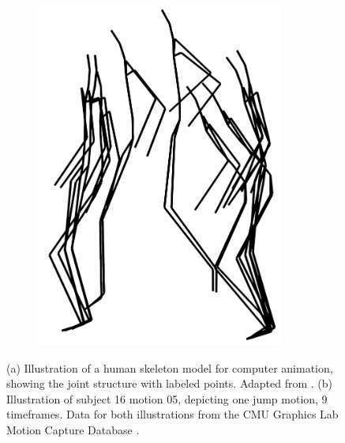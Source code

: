 \begin{figure}[ht]
\begin{subfigure}[b]{0.4\textwidth}
        \includegraphics[height=0.3\textheight ,width=0.9\textwidth]{figures/motion-capture-data/Fig_16_05_trace_9_frames.png}
        \caption{}
        \label{fig:jump_motion}
    \end{subfigure}
    \caption[Visualization of the Motion Capture Data]{(a) Illustration of a human skeleton model for computer animation, showing the joint structure with labeled points. Adapted from \cite{bauerLandmarkGuidedElasticShape2015}. (b) Illustration of subject 16 motion 05, depicting one jump motion, 9 timeframes. Data for both illustrations from the CMU Graphics Lab Motion Capture Database \cite{CarnegieMellonUniversity}.}
    \label{fig:combined-motion-capture-figure}
\end{figure}
